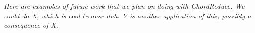 \textit{Here are examples of future work that we plan on doing with ChordReduce.  We could do X, which is cool because duh.  Y is another application of this, possibly a consequence of X.}








